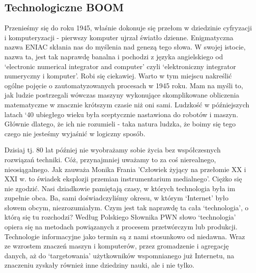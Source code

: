 \documentclass{article}
\begin{document}
	\subsection{Technologiczne BOOM}
	\par
	Przenieśmy się do roku 1945, właśnie dokonuje się przełom w dziedzinie cyfryzacji i komputeryzacji - pierwszy komputer ujrzał światło dzienne. Enigmatyczna nazwa ENIAC skłania nas do myślenia nad genezą tego słowa. W swojej istocie, nazwa ta, jest tak naprawdę banalna i pochodzi z języka angielskiego od ‘electronic numerical integrator and computer’\cite{ref4} czyli ‘elektroniczny integrator numeryczny i komputer’. Robi się ciekawiej. Warto w tym miejscu nakreślić ogólne pojęcie o  zautomatyzowanych procesach w 1945 roku. Mam na myśli to, jak ludzie postrzegali wówczas maszyny wykonujące skomplikowane obliczenia matematyczne w znacznie krótszym czasie niż oni sami. Ludzkość w późniejszych latach ‘40 ubiegłego wieku była sceptycznie nastawiona do robotów i maszyn. Głównie dlatego, że ich nie rozumieli - taka natura ludzka, że boimy się tego czego nie jesteśmy wyjaśnić w logiczny sposób.
	\par
	Dzisiaj tj. 80 lat później nie wyobrażamy sobie życia bez współczesnych rozwiązań techniki. Cóż, przynajmniej uważamy to za coś nierealnego, nieosiągalnego. Jak zauważa Monika Frania 'Człowiek żyjący na przełomie XX i XXI w. to świadek eksplozji przemian instrumentarium medialnego'\cite{ref5}. Ciężko się nie zgodzić. Nasi dziadkowie pamiętają czasy, w których technologia była im zupełnie obca. Ba, sami doświadczyliśmy okresu, w którym ‘Internet’ było słowem obcym, niezrozumiałym. Czym jest tak naprawdę ta cała ‘technologia’, o którą się tu rozchodzi? Według Polskiego Słownika PWN\cite{ref6} słowo ‘technologia’ opiera się na metodach powiązanych z procesem przetwórczym lub produkcji. Technologie informacyjne jako termin są z nami stosunkowo od niedawna. Wraz ze wzrostem znaczeń maszyn i komputerów, przez gromadzenie i agregację danych, aż do ‘targetowania’ użytkowników wspomnianego już Internetu, na znaczeniu zyskały również inne dziedziny nauki, ale i nie tylko.
	\par
\end{document}
